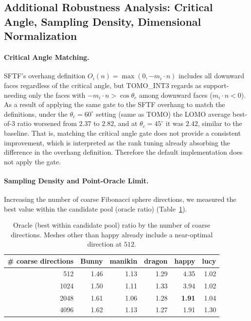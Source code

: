 \documentclass[11pt,a4paper]{article}
\begin{document}
\subsection{Additional Robustness Analysis: Critical Angle, Sampling Density, Dimensional Normalization}
\label{sec:robustness}

\paragraph{Critical Angle Matching.}
SFTF's overhang definition $O_i(n)=\max(0,-m_i\cdot n)$ includes all downward faces regardless of the critical angle, but
TOMO\_INT3 regards as support-needing only the faces with $-m_i\cdot n>\cos\theta_c$ among downward faces ($m_i\cdot n<0$).
As a result of applying the same gate to the SFTF overhang to match the definitions,
under the $\theta_c=60^\circ$ setting (same as TOMO) the LOMO average best-of-3 ratio
worsened from $2.37$ to $2.82$, and at $\theta_c=45^\circ$ it was $2.42$, similar to the baseline.
That is, matching the critical angle gate does not provide a consistent improvement,
which is interpreted as the rank tuning already absorbing the difference in the overhang definition.
Therefore the default implementation does not apply the gate.

\paragraph{Sampling Density and Point-Oracle Limit.}
Increasing the number of coarse Fibonacci sphere directions, we measured the best value within the candidate pool (oracle ratio) (Table~\ref{tab:sampling}).

\begin{table}[H]
\centering
\caption{Oracle (best within candidate pool) ratio by the number of coarse directions. Meshes other than happy
already include a near-optimal direction at $512$.}
\label{tab:sampling}
\begin{tabular}{rrrrrr}
\toprule
\# coarse directions & Bunny & manikin & dragon & happy & lucy\\
\midrule
512  & 1.46 & 1.13 & 1.29 & 4.35 & 1.02\\
1024 & 1.50 & 1.11 & 1.33 & 3.94 & 1.02\\
2048 & 1.61 & 1.06 & 1.28 & \textbf{1.91} & 1.04\\
4096 & 1.62 & 1.13 & 1.27 & 1.91 & 1.30\\
\bottomrule
\end{tabular}
\end{table}
\end{document}
